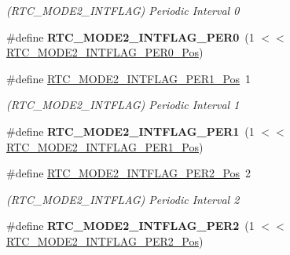 \begin{DoxyCompactItemize}
\begin{DoxyCompactList}\small\item\em (R\+T\+C\+\_\+\+M\+O\+D\+E2\+\_\+\+I\+N\+T\+F\+L\+A\+G) Periodic Interval 0 \end{DoxyCompactList}\item 
\hypertarget{group___s_a_m_l21___r_t_c_ga3dfa666204f4caf13c64eee8aeed9254}{}\#define {\bfseries R\+T\+C\+\_\+\+M\+O\+D\+E2\+\_\+\+I\+N\+T\+F\+L\+A\+G\+\_\+\+P\+E\+R0}~(1 $<$$<$ \hyperlink{group___s_a_m_l21___r_t_c_ga8c40fbd124282bd46b68cb8bacd4f266}{R\+T\+C\+\_\+\+M\+O\+D\+E2\+\_\+\+I\+N\+T\+F\+L\+A\+G\+\_\+\+P\+E\+R0\+\_\+\+Pos})\label{group___s_a_m_l21___r_t_c_ga3dfa666204f4caf13c64eee8aeed9254}

\item 
\hypertarget{group___s_a_m_l21___r_t_c_ga3aa2ac4d02e63db6d5be508587136f45}{}\#define \hyperlink{group___s_a_m_l21___r_t_c_ga3aa2ac4d02e63db6d5be508587136f45}{R\+T\+C\+\_\+\+M\+O\+D\+E2\+\_\+\+I\+N\+T\+F\+L\+A\+G\+\_\+\+P\+E\+R1\+\_\+\+Pos}~1\label{group___s_a_m_l21___r_t_c_ga3aa2ac4d02e63db6d5be508587136f45}

\begin{DoxyCompactList}\small\item\em (R\+T\+C\+\_\+\+M\+O\+D\+E2\+\_\+\+I\+N\+T\+F\+L\+A\+G) Periodic Interval 1 \end{DoxyCompactList}\item 
\hypertarget{group___s_a_m_l21___r_t_c_gaf72810323e56b4343ad62ebfae94e509}{}\#define {\bfseries R\+T\+C\+\_\+\+M\+O\+D\+E2\+\_\+\+I\+N\+T\+F\+L\+A\+G\+\_\+\+P\+E\+R1}~(1 $<$$<$ \hyperlink{group___s_a_m_l21___r_t_c_ga3aa2ac4d02e63db6d5be508587136f45}{R\+T\+C\+\_\+\+M\+O\+D\+E2\+\_\+\+I\+N\+T\+F\+L\+A\+G\+\_\+\+P\+E\+R1\+\_\+\+Pos})\label{group___s_a_m_l21___r_t_c_gaf72810323e56b4343ad62ebfae94e509}

\item 
\hypertarget{group___s_a_m_l21___r_t_c_ga36bc91a18c794d2be355e1458c37c202}{}\#define \hyperlink{group___s_a_m_l21___r_t_c_ga36bc91a18c794d2be355e1458c37c202}{R\+T\+C\+\_\+\+M\+O\+D\+E2\+\_\+\+I\+N\+T\+F\+L\+A\+G\+\_\+\+P\+E\+R2\+\_\+\+Pos}~2\label{group___s_a_m_l21___r_t_c_ga36bc91a18c794d2be355e1458c37c202}

\begin{DoxyCompactList}\small\item\em (R\+T\+C\+\_\+\+M\+O\+D\+E2\+\_\+\+I\+N\+T\+F\+L\+A\+G) Periodic Interval 2 \end{DoxyCompactList}\item 
\hypertarget{group___s_a_m_l21___r_t_c_gaa87837b0fa562ebb4fa748331298b605}{}\#define {\bfseries R\+T\+C\+\_\+\+M\+O\+D\+E2\+\_\+\+I\+N\+T\+F\+L\+A\+G\+\_\+\+P\+E\+R2}~(1 $<$$<$ \hyperlink{group___s_a_m_l21___r_t_c_ga36bc91a18c794d2be355e1458c37c202}{R\+T\+C\+\_\+\+M\+O\+D\+E2\+\_\+\+I\+N\+T\+F\+L\+A\+G\+\_\+\+P\+E\+R2\+\_\+\+Pos})\label{group___s_a_m_l21___r_t_c_gaa87837b0fa562ebb4fa748331298b605}


\end{DoxyCompactItemize}
